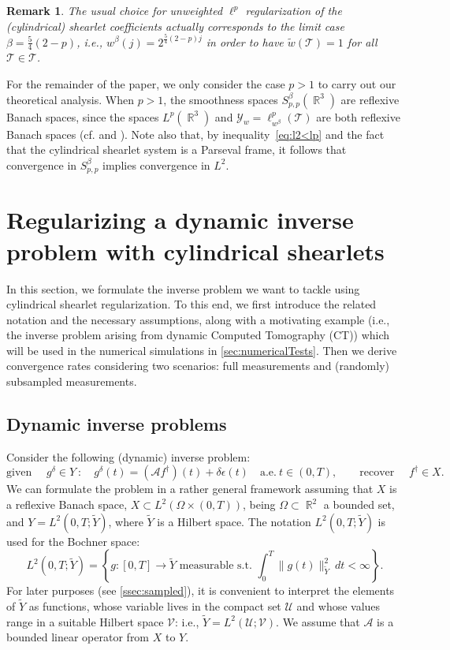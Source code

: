 \documentclass[11pt,a4paper]{article}
\numberwithin{equation}{section}
\newtheorem{remark}{Remark}[section]
\DeclareMathOperator{\R}{\mathbb{R}}
\newcommand{\mcT}{\mathcal{T}}  %
\newcommand{\mcY}{\mathcal{Y}}
\newcommand{\msT}{\mathscr{T}} %
\newcommand{\cA}{\mathscr{A}}
\def\gd{{g}^{\delta}}
\begin{document}
\begin{remark} \label{rmrk:noWeights}
The usual choice for unweighted $\ell^p$ regularization of the (cylindrical) shearlet coefficients actually corresponds to the limit case $\beta = \frac{5}{4}(2-p)$, i.e., $w^\beta (j) = 2^{\frac{5}{4}(2-p)j}$ in order to have $\tilde{w}(\msT) = 1$ for all $\msT \in \mcT$.
\end{remark}

For the remainder of the paper, we only consider the case $p > 1$ to carry out our theoretical analysis. When $p>1$, the smoothness spaces $S^\beta_{p,p}(\R^3)$ are reflexive Banach spaces, since the spaces $L^p(\R^3)$ and $\mcY_w = \ell^p_{w^{\beta}}(\mcT)$ are both reflexive Banach spaces (cf. \cite[Theorem 3.21]{voigtlaender2023embeddings} and \cite[Theorem 2.8]{feichtinger1985banach}). 
Note also that, by inequality~\eqref{eq:l2<lp} and the fact that the cylindrical shearlet system is a Parseval frame, it follows that convergence in ${S^\beta_{p,p}}$ implies convergence in $L^2$.


\section{Regularizing a dynamic inverse problem with cylindrical shearlets} \label{sec:dynTomo}

In this section, we formulate the inverse problem we want to tackle using cylindrical shearlet regularization.  
To this end, we first introduce the related notation and the necessary assumptions, along with a motivating example (i.e., the inverse problem arising from dynamic Computed Tomography (CT)) which will be used in the numerical simulations in \cref{sec:numericalTests}. 
Then we derive convergence rates considering two scenarios: full measurements and (randomly) subsampled measurements.


\subsection{Dynamic inverse problems}
\label{ssec:dynInvProb}
Consider the following (dynamic) inverse problem:
\begin{equation}\label{eq:ProblemSetting}
\text{given } \quad \gd \in Y \ : \quad \gd(t) = (\cA f^{\dag}) (t) + \delta \epsilon(t) \quad \text{a.e.}\ t \in (0,T), 
\qquad \text{recover } \quad  f^{\dag} \in X.
\end{equation}
We can formulate the problem in a rather general framework assuming that $X$ is a reflexive Banach space, $X \subset L^2(\Omega \times (0,T))$, being $\Omega \subset \R^2$ a bounded set, 
 and $Y = L^2(0,T; \tilde{Y})$, where $\tilde{Y}$ is a Hilbert space. The notation $L^2(0,T; \tilde{Y})$ is used for the Bochner space:
\[
L^2(0,T; \tilde{Y}) = \left\{  g \colon [0,T]  \rightarrow \tilde{Y} \text{ measurable s.t. } \int_0^T \|g(t)\|_{\tilde{Y}}^2\ dt < \infty\right\}.
\]
For later purposes (see \cref{ssec:sampled}), it is convenient to interpret the elements of $\tilde{Y}$ as functions, whose variable lives in the compact set $\mathcal{U}$ and whose values range in a suitable Hilbert space $\mathcal{V}$: i.e.,  $\tilde{Y} = L^2(\mathcal{U};\mathcal{V})$.
We assume that $\cA$ is a bounded linear operator from $X$ to $Y$. 
\end{document}
